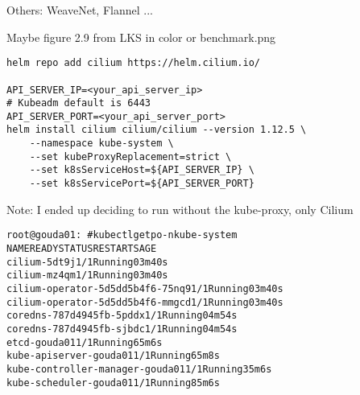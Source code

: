 \documentclass[Screen16to9,17pt]{foils}
\begin{document}

\begin{list2}
\item {}

\item Others: WeaveNet, Flannel ...

\item Maybe figure 2.9 from LKS in color or benchmark.png
\end{list2}


\begin{verbatim}
helm repo add cilium https://helm.cilium.io/

API_SERVER_IP=<your_api_server_ip>
# Kubeadm default is 6443
API_SERVER_PORT=<your_api_server_port>
helm install cilium cilium/cilium --version 1.12.5 \
    --namespace kube-system \
    --set kubeProxyReplacement=strict \
    --set k8sServiceHost=${API_SERVER_IP} \
    --set k8sServicePort=${API_SERVER_PORT}
\end{verbatim}

\begin{list2}
\item
\end{list2}
Note: I ended up deciding to run without the kube-proxy, only Cilium


\begin{alltt}
root@gouda01:~#  kubectl get po -n kube-system
NAME                               READY   STATUS    RESTARTS   AGE
cilium-5dt9j                       1/1     Running   0          3m40s
cilium-mz4qm                       1/1     Running   0          3m40s
cilium-operator-5d5dd5b4f6-75nq9   1/1     Running   0          3m40s
cilium-operator-5d5dd5b4f6-mmgcd   1/1     Running   0          3m40s
coredns-787d4945fb-5pddx           1/1     Running   0          4m54s
coredns-787d4945fb-sjbdc           1/1     Running   0          4m54s
etcd-gouda01                       1/1     Running   6          5m6s
kube-apiserver-gouda01             1/1     Running   6          5m8s
kube-controller-manager-gouda01    1/1     Running   3          5m6s
kube-scheduler-gouda01             1/1     Running   8          5m6s
\end{alltt}


\slide{Cilium CLI tool}
\end{document}
